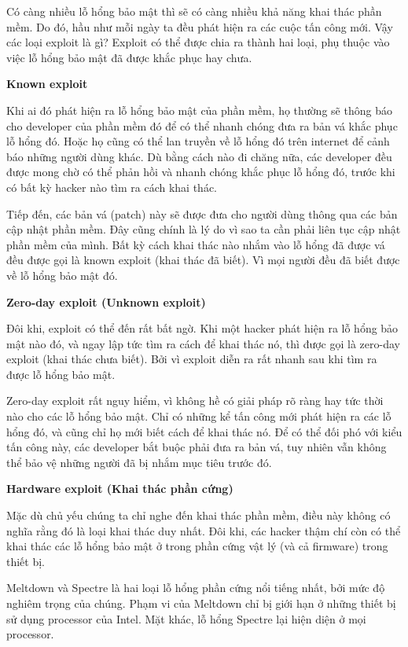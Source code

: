 \documentclass{article}
\begin{document}
Có càng nhiều lỗ hổng bảo mật thì sẽ có càng nhiều khả năng khai thác phần mềm. Do đó, hầu như mỗi ngày ta đều phát hiện ra các cuộc tấn công mới. Vậy các loại exploit là gì? Exploit có thể được chia ra thành hai loại, phụ thuộc vào việc lỗ hổng bảo mật đã được khắc phục hay chưa.

\textbf{Known exploit}

Khi ai đó phát hiện ra lỗ hổng bảo mật của phần mềm, họ thường sẽ thông báo cho developer của phần mềm đó để có thể nhanh chóng đưa ra bản vá khắc phục lỗ hổng đó. Hoặc họ cũng có thể lan truyền về lỗ hổng đó trên internet để cảnh báo những người dùng khác. Dù bằng cách nào đi chăng nữa, các developer đều được mong chờ có thể phản hồi và nhanh chóng khắc phục lỗ hổng đó, trước khi có bất kỳ hacker nào tìm ra cách khai thác.

Tiếp đến, các bản vá (patch) này sẽ được đưa cho người dùng thông qua các bản cập nhật phần mềm. Đây cũng chính là lý do vì sao ta cần phải liên tục cập nhật phần mềm của mình. Bất kỳ cách khai thác nào nhắm vào lỗ hổng đã được vá đều được gọi là known exploit (khai thác đã biết). Vì mọi người đều đã biết được về lỗ hổng bảo mật đó.

\textbf{Zero-day exploit (Unknown exploit)}

Đôi khi, exploit có thể đến rất bất ngờ. Khi một hacker phát hiện ra lỗ hổng bảo mật nào đó, và ngay lập tức tìm ra cách để khai thác nó, thì được gọi là zero-day exploit (khai thác chưa biết). Bởi vì exploit diễn ra rất nhanh sau khi tìm ra được lỗ hổng bảo mật.

Zero-day exploit rất nguy hiểm, vì không hề có giải pháp rõ ràng hay tức thời nào cho các lỗ hổng bảo mật. Chỉ có những kể tấn công mới phát hiện ra các lỗ hổng đó, và cũng chỉ họ mới biết cách để khai thác nó. Để có thể đối phó với kiểu tấn công này, các developer bắt buộc phải đưa ra bản vá, tuy nhiên vẫn không thể bảo vệ những người đã bị nhắm mục tiêu trước đó.

\textbf{Hardware exploit (Khai thác phần cứng)}

Mặc dù chủ yếu chúng ta chỉ nghe đến khai thác phần mềm, điều này không có nghĩa rằng đó là loại khai thác duy nhất. Đôi khi, các hacker thậm chí còn có thể khai thác các lỗ hổng bảo mật ở trong phần cứng vật lý (và cả firmware) trong thiết bị.

Meltdown và Spectre là hai loại lỗ hổng phần cứng nổi tiếng nhất, bởi mức độ nghiêm trọng của chúng. Phạm vi của Meltdown chỉ bị giới hạn ở những thiết bị sử dụng processor của Intel. Mặt khác, lỗ hổng Spectre lại hiện diện ở mọi processor.
\end{document}
